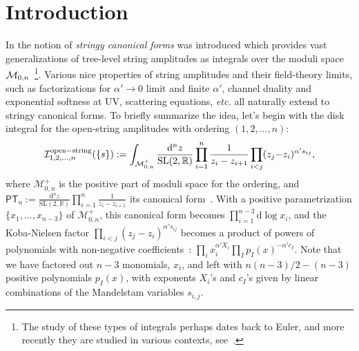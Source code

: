 \documentclass[hidelinks,12pt]{article}
\begin{document}
\vfill \eject



\baselineskip=18pt

\tableofcontents

\newpage

\section{Introduction}
In \cite{Arkani-Hamed:2019mrd} the notion of {\it stringy canonical forms} was introduced which provides vast generalizations of tree-level string amplitudes as integrals over the moduli space ${\cal M}_{0, n}$~\footnote{The study of these types of integrals perhaps dates back to Euler, and more recently they are studied in various contexts, see~\cite{Mellin, Eulermellin, Panzer:2019yxl}. }. Various nice properties of string amplitudes and their field-theory limits, such as factorizations for $\alpha' \to 0$ limit and finite $\alpha'$, channel duality and exponential softness at UV, scattering equations, {\it etc.} all naturally extend to stringy canonical forms. To briefly summarize the idea, let's begin with the disk integral for the open-string amplitudes with ordering $(1,2,\dots, n)$:
\begin{equation}\label{stringint}
{\cal I}^{\rm open-string}_{1,2,\dots,n} (\{s\}):=\int_{\mathcal M_{0,n}^+}
\frac{\mathrm d^{n}z}{\mathrm{SL}(2,\mathbb{R})} \prod_{i=1}^{n}\frac{1}{z_{i}-z_{i{+}1}}
\prod_{i<j}(z_j{-}z_i)^{\alpha' s_{ij}},
\end{equation}
where $\mathcal M_{0,n}^+$ is the positive part of moduli space for the ordering, and $\mathsf{PT}_n:=\frac{\mathrm d^{n}z}{\mathrm{SL}(2,\mathbb{R})} \prod_{i=1}^{n}\frac{1}{z_{i}-z_{i+1}}$ its canonical form~\cite{Arkani-Hamed:2017mur}.  %
With a positive parametrization $\{x_1,\dots,x_{n-3}\}$ of $\mathcal M_{0,n}^+$, 
this canonical form becomes $\prod_{i=1}^{n-3}\mathrm d \log x_i$, and the Koba-Nielsen factor $\prod_{i<j}(z_j-z_i)^{\alpha' s_{i j}}$ becomes a product of powers of polynomials with 
non-negative coefficients~\cite{Arkani-Hamed:2019mrd}: $\prod_i x_i^{\alpha' X_i} \prod_I p_I(x)^{-\alpha' c_I}$. Note that we have factored out $n{-}3$ monomials, $x_i$, and left with $n(n{-}3)/2-(n{-}3)$ positive polynomials $p_I(x)$, with exponents $X_i$'s and $c_I$'s given by linear combinations of the Mandelstam variables $s_{i,j}$. 
\end{document}
